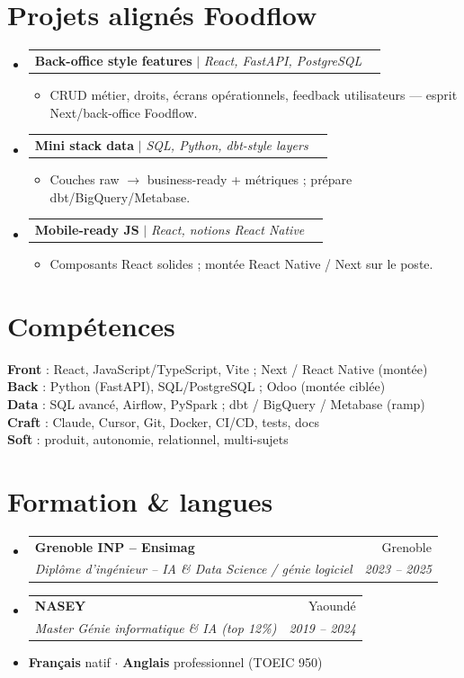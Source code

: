 \documentclass[a4paper,10.5pt]{article}
\makeatletter
\newcommand{\resumeItem}[1]{\item\small{#1}}
\newcommand{\resumeSubheading}[4]{\vspace{3pt}\item\begin{tabular*}{0.97\textwidth}[t]{l@{\extracolsep{\fill}}r}\textbf{#1}&{#2}\\\textit{\small #3}&\textit{\small #4}\\\end{tabular*}\vspace{1pt}}
\newcommand{\resumeProjectHeading}[2]{\vspace{2pt}\item\begin{tabular*}{0.97\textwidth}{l@{\extracolsep{\fill}}r}\small #1&#2\\\end{tabular*}\vspace{1pt}}
\newcommand{\resumeSubHeadingListStart}{\begin{itemize}[leftmargin=0.08in,label={}]}
\newcommand{\resumeSubHeadingListEnd}{\end{itemize}}
\makeatother
\begin{document}
\section{Projets align\'es Foodflow}
\resumeSubHeadingListStart
  \resumeProjectHeading{\textbf{Back-office style features} $|$ \emph{React, FastAPI, PostgreSQL}}{}
  \begin{itemize}\resumeItem{CRUD m\'etier, droits, \'ecrans op\'erationnels, feedback utilisateurs --- esprit Next/back-office Foodflow.}\end{itemize}
  \resumeProjectHeading{\textbf{Mini stack data} $|$ \emph{SQL, Python, dbt-style layers}}{}
  \begin{itemize}\resumeItem{Couches raw $\rightarrow$ business-ready + m\'etriques ; pr\'epare dbt/BigQuery/Metabase.}\end{itemize}
  \resumeProjectHeading{\textbf{Mobile-ready JS} $|$ \emph{React, notions React Native}}{}
  \begin{itemize}\resumeItem{Composants React solides ; mont\'ee React Native / Next sur le poste.}\end{itemize}
\resumeSubHeadingListEnd

\section{Comp\'etences}
\begin{itemize}[leftmargin=0.08in,label={}]\small{\item{
\textbf{Front} : React, JavaScript/TypeScript, Vite ; Next / React Native (mont\'ee) \\
\textbf{Back} : Python (FastAPI), SQL/PostgreSQL ; Odoo (mont\'ee cibl\'ee) \\
\textbf{Data} : SQL avanc\'e, Airflow, PySpark ; dbt / BigQuery / Metabase (ramp) \\
\textbf{Craft} : Claude, Cursor, Git, Docker, CI/CD, tests, docs \\
\textbf{Soft} : produit, autonomie, relationnel, multi-sujets
}}\end{itemize}

\section{Formation \& langues}
\resumeSubHeadingListStart
  \resumeSubheading{Grenoble INP -- Ensimag}{Grenoble}{Dipl\^ome d'ing\'enieur -- IA \& Data Science / g\'enie logiciel}{2023 -- 2025}
  \resumeSubheading{NASEY}{Yaound\'e}{Master G\'enie informatique \& IA (top 12\%)}{2019 -- 2024}
\resumeSubHeadingListEnd
\begin{itemize}[leftmargin=0.08in,label={}]\item \textbf{Fran\c{c}ais} natif $\cdot$ \textbf{Anglais} professionnel (TOEIC 950)\end{itemize}
\end{document}

